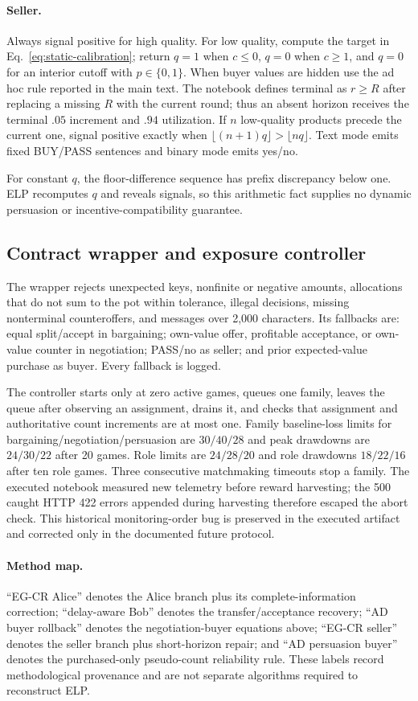 \paragraph{Seller.}
Always signal positive for high quality. For low quality, compute the target in
Eq.~\ref{eq:static-calibration}; return $q=1$ when $c\le0$, $q=0$ when $c\ge1$,
and $q=0$ for an interior cutoff with $p\in\{0,1\}$. When buyer values are
hidden use the ad hoc rule reported in the main text. The notebook defines
terminal as $r\ge R$ after replacing a missing $R$ with the current round; thus
an absent horizon receives the terminal $.05$ increment and $.94$ utilization.
If $n$ low-quality products precede the current one, signal positive exactly
when $\lfloor(n+1)q\rfloor>\lfloor nq\rfloor$. Text mode emits fixed BUY/PASS
sentences and binary mode emits yes/no.

For constant $q$, the floor-difference sequence has prefix discrepancy below
one. ELP recomputes $q$ and reveals signals, so this arithmetic fact supplies no
dynamic persuasion or incentive-compatibility guarantee.

\subsection{Contract wrapper and exposure controller}

The wrapper rejects unexpected keys, nonfinite or negative amounts, allocations
that do not sum to the pot within tolerance, illegal decisions, missing
nonterminal counteroffers, and messages over 2,000 characters. Its fallbacks
are: equal split/accept in bargaining; own-value offer, profitable acceptance,
or own-value counter in negotiation; PASS/no as seller; and prior expected-value
purchase as buyer. Every fallback is logged.

The controller starts only at zero active games, queues one family, leaves the
queue after observing an assignment, drains it, and checks that assignment and
authoritative count increments are at most one. Family baseline-loss limits for
bargaining/negotiation/persuasion are $30/40/28$ and peak drawdowns are
$24/30/22$ after 20 games. Role limits are $24/28/20$ and role drawdowns
$18/22/16$ after ten role games. Three consecutive matchmaking timeouts stop a
family. The executed notebook measured new telemetry before reward harvesting;
the 500 caught HTTP 422 errors appended during harvesting therefore escaped the
abort check. This historical monitoring-order bug is preserved in the executed
artifact and corrected only in the documented future protocol.

\paragraph{Method map.}
``EG-CR Alice'' denotes the Alice branch plus its complete-information
correction; ``delay-aware Bob'' denotes the transfer/acceptance recovery;
``AD buyer rollback'' denotes the negotiation-buyer equations above;
``EG-CR seller'' denotes the seller branch plus short-horizon repair; and
``AD persuasion buyer'' denotes the purchased-only pseudo-count reliability
rule. These labels record methodological provenance and are not separate
algorithms required to
reconstruct ELP.
